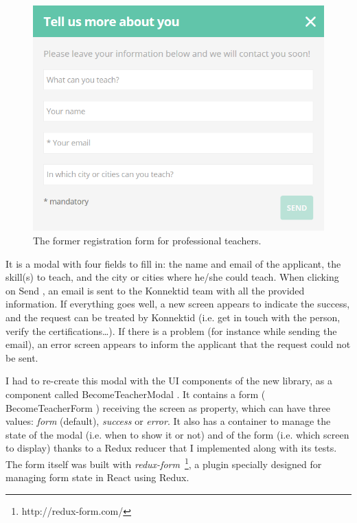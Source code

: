  \begin{figure}[H]
    \centering
    \includegraphics[scale=0.6]{figure/signUpFlow.png}
    \caption{The former registration form for professional teachers.}
    \label{fig:signUpFlow}
\end{figure}

It is a modal with four fields to fill in: the name and email of the applicant, the skill(s) to teach, and the city or cities where he/she could teach. When clicking on \guillemotleft{} Send \guillemotright{}, an email is sent to the Konnektid team with all the provided information. If everything goes well, a new screen appears to indicate the success, and the request can be treated by Konnektid (i.e. get in touch with the person, verify the certifications\ldots). If there is a problem (for instance while sending the email), an error screen appears to inform the applicant that the request could not be sent.

I had to re-create this modal with the UI components of the new library, as a component called \guillemotleft{} BecomeTeacherModal \guillemotright{}. It contains a form (\guillemotleft{} BecomeTeacherForm \guillemotright{}) receiving the screen as property, which can have three values: \textit{form} (default), \textit{success} or \textit{error}. It also has a container to manage the state of the modal (i.e. when to show it or not) and of the form (i.e. which screen to display) thanks to a Redux reducer that I implemented along with its tests. The form itself was built with \textit{redux-form}~\footnote{http://redux-form.com/}, a plugin specially designed for managing form state in React using Redux.

